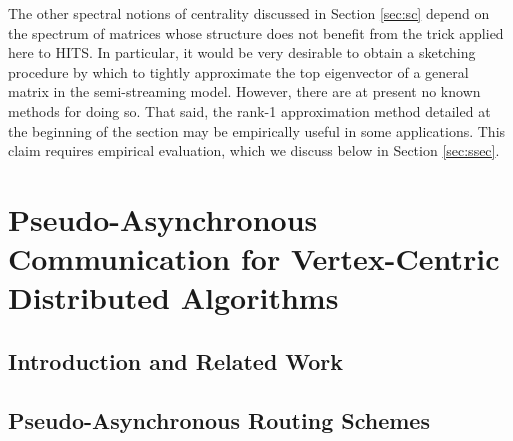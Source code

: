 \documentclass{report}
\begin{document}
The other spectral notions of centrality discussed in Section \ref{sec:sc} depend on the spectrum of matrices whose structure does not benefit from the trick applied here to HITS. 
In particular, it would be very desirable to obtain a sketching procedure by which to tightly approximate the top eigenvector of a general matrix in the semi-streaming model. 
However, there are at present no known methods for doing so. 
That said, the rank-1 approximation method detailed at the beginning of the section may be empirically useful in some applications. 
This claim requires empirical evaluation, which we discuss below in Section \ref{sec:ssec}. 



\chapter{Pseudo-Asynchronous Communication for Vertex-Centric Distributed Algorithms}
 \label{chap:async}

\section{Introduction and Related Work} \label{async:sec:intro}

\section{Pseudo-Asynchronous Routing Schemes} \label{async:sec:async}
\end{document}
